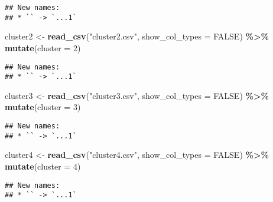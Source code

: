 \documentclass[
]{article}
\newenvironment{Shaded}{\begin{snugshade}}{\end{snugshade}}
\newcommand{\AttributeTok}[1]{\textcolor[rgb]{0.13,0.29,0.53}{#1}}
\newcommand{\ConstantTok}[1]{\textcolor[rgb]{0.56,0.35,0.01}{#1}}
\newcommand{\DecValTok}[1]{\textcolor[rgb]{0.00,0.00,0.81}{#1}}
\newcommand{\FunctionTok}[1]{\textcolor[rgb]{0.13,0.29,0.53}{\textbf{#1}}}
\newcommand{\NormalTok}[1]{#1}
\newcommand{\OtherTok}[1]{\textcolor[rgb]{0.56,0.35,0.01}{#1}}
\newcommand{\SpecialCharTok}[1]{\textcolor[rgb]{0.81,0.36,0.00}{\textbf{#1}}}
\newcommand{\StringTok}[1]{\textcolor[rgb]{0.31,0.60,0.02}{#1}}
\begin{document}
\begin{verbatim}
## New names:
## * `` -> `...1`
\end{verbatim}

\begin{Shaded}
\begin{Highlighting}[]
\NormalTok{cluster2 }\OtherTok{\textless{}{-}} \FunctionTok{read\_csv}\NormalTok{(}\StringTok{"cluster2.csv"}\NormalTok{, }\AttributeTok{show\_col\_types =} \ConstantTok{FALSE}\NormalTok{) }\SpecialCharTok{\%\textgreater{}\%} \FunctionTok{mutate}\NormalTok{(}\AttributeTok{cluster =} \DecValTok{2}\NormalTok{)}
\end{Highlighting}
\end{Shaded}

\begin{verbatim}
## New names:
## * `` -> `...1`
\end{verbatim}

\begin{Shaded}
\begin{Highlighting}[]
\NormalTok{cluster3 }\OtherTok{\textless{}{-}} \FunctionTok{read\_csv}\NormalTok{(}\StringTok{"cluster3.csv"}\NormalTok{, }\AttributeTok{show\_col\_types =} \ConstantTok{FALSE}\NormalTok{) }\SpecialCharTok{\%\textgreater{}\%} \FunctionTok{mutate}\NormalTok{(}\AttributeTok{cluster =} \DecValTok{3}\NormalTok{)}
\end{Highlighting}
\end{Shaded}

\begin{verbatim}
## New names:
## * `` -> `...1`
\end{verbatim}

\begin{Shaded}
\begin{Highlighting}[]
\NormalTok{cluster4 }\OtherTok{\textless{}{-}} \FunctionTok{read\_csv}\NormalTok{(}\StringTok{"cluster4.csv"}\NormalTok{, }\AttributeTok{show\_col\_types =} \ConstantTok{FALSE}\NormalTok{) }\SpecialCharTok{\%\textgreater{}\%} \FunctionTok{mutate}\NormalTok{(}\AttributeTok{cluster =} \DecValTok{4}\NormalTok{)}
\end{Highlighting}
\end{Shaded}

\begin{verbatim}
## New names:
## * `` -> `...1`
\end{verbatim}
\end{document}
